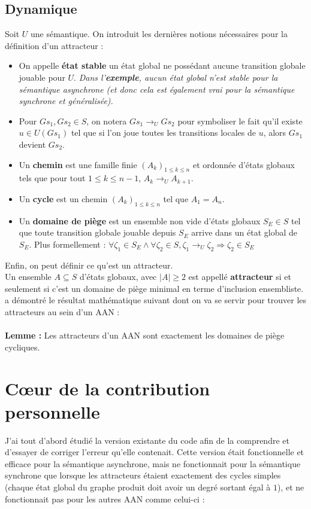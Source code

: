 \documentclass[12pt,a4paper]{article}
\begin{document}
\subsection{Dynamique}
Soit $U$ une sémantique. On introduit les dernières notions nécessaires pour la définition d'un attracteur :
\begin{itemize}
	\item On appelle \textbf{état stable} un état global ne possédant aucune transition globale jouable pour $U$.
	\emph{Dans l'\textbf{exemple}, aucun état global n'est stable pour la sémantique asynchrone (et donc cela est également vrai pour la sémantique synchrone et généralisée).}
	\item Pour $Gs_1,Gs_2\in S$, on notera $Gs_1\rightarrow _UGs_2$ pour symboliser le fait qu'il existe $u\in U(Gs_1)$ tel que si l'on joue toutes les transitions locales de $u$, alors $Gs_1$ devient $Gs_2$.
	\item Un \textbf{chemin} est une famille finie $(A_k)_{1\leq k\leq n}$ et ordonnée d'états globaux tels que pour tout $1\leq k\leq n-1$, $A_k\rightarrow _U A_{k+1}$.
	\item Un \textbf{cycle} est un chemin $(A_k)_{1\leq k\leq n}$ tel que $A_1=A_n$.
	\item Un \textbf{domaine de piège} est un ensemble non vide d'états globaux $S_E\in S$ tel que toute transition globale jouable depuis $S_E$ arrive dans un état global de $S_E$. Plus formellement : 
	$\forall\zeta _1\in S_E \wedge\forall\zeta _2\in S, \zeta _1 \rightarrow _U\zeta _2 \Rightarrow\zeta _2\in S_E$
\end{itemize}
Enfin, on peut définir ce qu'est un attracteur.\\
Un ensemble $A\subseteq S$ d'états globaux, avec $|A|\geq2$ est appellé \textbf{attracteur} si et seulement si c'est un domaine de piège minimal en terme d'inclusion ensembliste.\\
\cite{chapitre} a démontré le résultat mathématique suivant dont on va se servir pour trouver les attracteurs au sein d'un AAN :\\ \\
\textbf{Lemme :} Les attracteurs d'un AAN sont exactement les domaines de piège cycliques.

\section{Cœur de la contribution personnelle}
\hypertarget{debutpartie4}{
J'ai tout d'abord étudié la version existante du code afin de la comprendre et d'essayer de corriger l'erreur qu'elle contenait. Cette version était fonctionnelle et efficace pour la sémantique asynchrone, mais ne fonctionnait pour 
la sémantique synchrone que lorsque les attracteurs étaient exactement des cycles simples (chaque état global du graphe produit doit avoir un degré sortant égal à $1$), et ne fonctionnait pas pour les autres AAN comme 
celui-ci :\\ \\ \\
}
\end{document}
